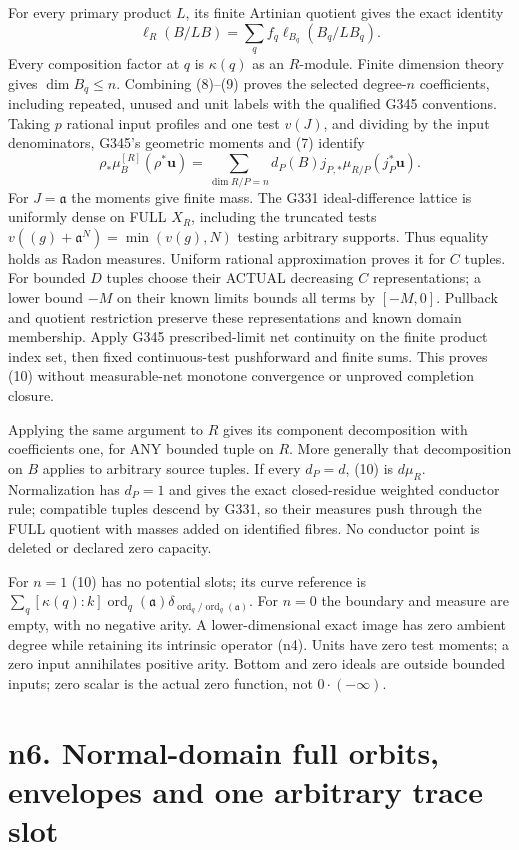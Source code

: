 For every primary product $L$, its finite Artinian quotient gives the exact identity
\[
 \ell_R(B/LB)=\sum_q f_q\ell_{B_q}(B_q/LB_q). \tag{9}
\]
Every composition factor at $q$ is $\kappa(q)$ as an $R$-module. Finite dimension theory gives $\dim B_q\le n$. Combining (8)--(9) proves the selected degree-$n$ coefficients, including repeated, unused and unit labels with the qualified G345 conventions. Taking $p$ rational input profiles and one test $v(J)$, and dividing by the input denominators, G345's geometric moments and (7) identify
\[
 \rho_*\mu_B^{[R]}(\rho^*\boldsymbol u)
 =\sum_{\dim R/P=n}d_P(B)j_{P,*}\mu_{R/P}(j_P^*\boldsymbol u). \tag{10}
\]
For $J=\mathfrak a$ the moments give finite mass. The G331 ideal-difference lattice is uniformly dense on FULL $X_R$, including the truncated tests $v((g)+\mathfrak a^N)=\min(v(g),N)$ testing arbitrary supports. Thus equality holds as Radon measures. Uniform rational approximation proves it for $C$ tuples. For bounded $D$ tuples choose their ACTUAL decreasing $C$ representations; a lower bound $-M$ on their known limits bounds all terms by $[-M,0]$. Pullback and quotient restriction preserve these representations and known domain membership. Apply G345 prescribed-limit net continuity on the finite product index set, then fixed continuous-test pushforward and finite sums. This proves (10) without measurable-net monotone convergence or unproved completion closure.

Applying the same argument to $R$ gives its component decomposition with coefficients one, for ANY bounded tuple on $R$. More generally that decomposition on $B$ applies to arbitrary source tuples. If every $d_P=d$, (10) is $d\mu_R$. Normalization has $d_P=1$ and gives the exact closed-residue weighted conductor rule; compatible tuples descend by G331, so their measures push through the FULL quotient with masses added on identified fibres. No conductor point is deleted or declared zero capacity.

For $n=1$ (10) has no potential slots; its curve reference is $\sum_q[\kappa(q):k]\operatorname{ord}_q(\mathfrak a)\delta_{\operatorname{ord}_q/\operatorname{ord}_q(\mathfrak a)}$. For $n=0$ the boundary and measure are empty, with no negative arity. A lower-dimensional exact image has zero ambient degree while retaining its intrinsic operator (n4). Units have zero test moments; a zero input annihilates positive arity. Bottom and zero ideals are outside bounded inputs; zero scalar is the actual zero function, not $0\cdot(-\infty)$.


\section{n6. Normal-domain full orbits, envelopes and one arbitrary trace slot}
